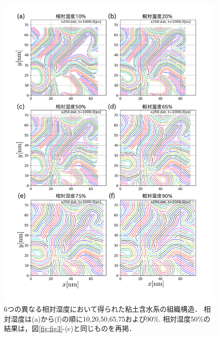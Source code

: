 \begin{figure}[h]
	\begin{center}
	\includegraphics[width=0.7\linewidth]{Figs/fig4.pdf} 
	\end{center}
	\caption{
		6つの異なる相対湿度において得られた粘土含水系の組織構造．
		相対湿度は(a)から(f)の順に10,20,50,65,75および90$\%$. 
		相対湿度50$\%$の結果は，図\ref{fig:fig3}-(c)と同じものを再掲．
	} 
	\label{fig:fig4}
\end{figure}
